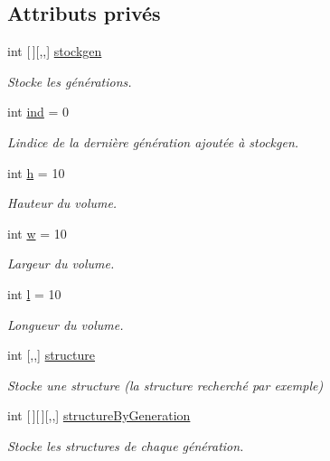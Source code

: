 \subsection*{Attributs privés}
\begin{DoxyCompactItemize}
\item 
int \mbox{[}$\,$\mbox{]}\mbox{[},,\mbox{]} \mbox{\hyperlink{class_detection_ad90b57df50e957490ef10ec0ca151680}{stockgen}}
\begin{DoxyCompactList}\small\item\em Stocke les générations. \end{DoxyCompactList}\item 
int \mbox{\hyperlink{class_detection_ac2c7885d3e4d086504e66eb365207c1e}{ind}} = 0
\begin{DoxyCompactList}\small\item\em L\textquotesingle{}indice de la dernière génération ajoutée à stockgen. \end{DoxyCompactList}\item 
int \mbox{\hyperlink{class_detection_ae2432d029788c3aa58e832716a7832e4}{h}} = 10
\begin{DoxyCompactList}\small\item\em Hauteur du volume. \end{DoxyCompactList}\item 
int \mbox{\hyperlink{class_detection_a15fdbc0a47657ec7c4bf5228a950079d}{w}} = 10
\begin{DoxyCompactList}\small\item\em Largeur du volume. \end{DoxyCompactList}\item 
int \mbox{\hyperlink{class_detection_a22ac4a8c7bfff75ddde6599e2868383d}{l}} = 10
\begin{DoxyCompactList}\small\item\em Longueur du volume. \end{DoxyCompactList}\item 
int \mbox{[},,\mbox{]} \mbox{\hyperlink{class_detection_a87b658cb3620885f810fb260efbb4b10}{structure}}
\begin{DoxyCompactList}\small\item\em Stocke une structure (la structure recherché par exemple) \end{DoxyCompactList}\item 
int \mbox{[}$\,$\mbox{]}\mbox{[}$\,$\mbox{]}\mbox{[},,\mbox{]} \mbox{\hyperlink{class_detection_abdc02d1290b7db51b15359c23b7d8b7a}{structure\+By\+Generation}}
\begin{DoxyCompactList}\small\item\em Stocke les structures de chaque génération. \end{DoxyCompactList}\item 

\end{DoxyCompactItemize}
